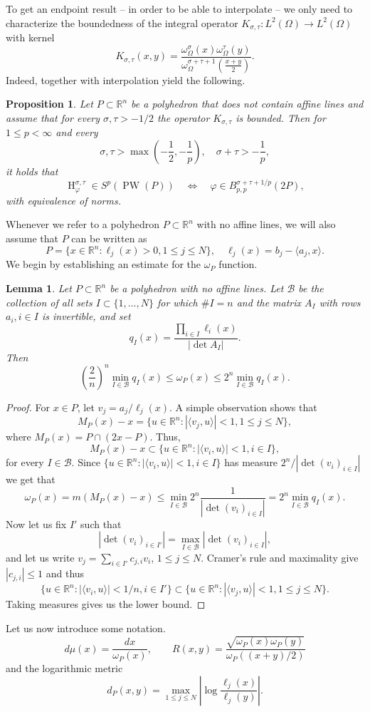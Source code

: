 \documentclass{amsart}
\theoremstyle{plain}
\newtheorem{lm}[theo]{Lemma}
\newtheorem{prop}[theo]{Proposition}
\DeclareMathOperator{\Ha}{H}
\DeclareMathOperator{\PW}{PW}
\begin{document}
To get an endpoint result -- in order to be able to interpolate -- we only need to characterize the boundedness of the integral operator $K_{\sigma,\tau}:L^2(\Omega)\to L^2(\Omega)$ with kernel
$$K_{\sigma,\tau}(x,y)=\frac{\omega_\Omega^\sigma(x)\omega_{\Omega}^\tau(y)}{\omega_\Omega^{\sigma+\tau+1}(\frac{x+y}{2})}.$$ Indeed, \cite[Corollary 1.5, Lemma 3.9 and Theorem 3.10]{bampouras2024besovspacesschattenclass} together with interpolation yield the following.
\begin{prop}\label{polyhconseq}
	Let $P\subset\mathbb{R}^n$ be a polyhedron that does not contain affine lines and assume that for every $\sigma,\tau>-1/2$ the operator $K_{\sigma,\tau}$ is bounded. Then for $1\leq p<\infty$ and every
	$$\sigma,\tau>\max(-\frac{1}{2},-\frac{1}{p}), \quad \sigma+\tau>-\frac{1}{p},$$ it holds that
	$$\Ha_\varphi^{\sigma,\tau}\in S^p(\PW(P))
	\quad\Longleftrightarrow\quad
	\varphi\in B_{p,p}^{\sigma+\tau+1/p}(2P),$$
	with equivalence of norms.
\end{prop}
Whenever we refer to a polyhedron $P\subset\mathbb{R}^n$ with no affine lines, we will also assume that $P$ can be written as
$$P=\{x\in\mathbb{R}^n:\ell_j(x)>0, 1\leq j\leq N\}, \quad \ell_j(x)=b_j-\langle a_j, x\rangle.$$
We begin by establishing an estimate for the $\omega_P$ function.
\begin{lm}\label{omegaformula}
	Let $P\subset\mathbb{R}^n$ be a polyhedron with no affine lines.
	Let $\mathcal{B}$ be the collection of all sets $I\subset \{1,...,N\}$ for which $\# I =n$ and the matrix $A_I$ with rows $a_i, i\in I$ is invertible, and set
	$$q_I(x)=\dfrac{\prod_{i\in I}\ell_i(x)}{|\det A_I|}.$$
	Then $$\left(\frac{2}{n}\right)^n \min_{I\in \mathcal{B}}q_I(x)\leq \omega_P(x)\leq 2^n \min_{I\in \mathcal{B}}q_I(x).$$
\end{lm}
\begin{proof}
	For $x\in P$, let $v_j=a_j/\ell_j(x).$ A simple observation shows that
	$$M_P(x)-x=\{u\in\mathbb{R}^n:|\langle v_j,u\rangle|<1, 1\leq j\leq N\},$$ where $M_P(x)=P\cap (2x-P)$. Thus,
	$$M_P(x)-x\subset \{u\in\mathbb{R}^n:|\langle v_i,u\rangle|<1, i\in I\},$$ for every $I\in\mathcal{B}$. Since $ \{u\in\mathbb{R}^n:|\langle v_i,u\rangle|<1, i\in I\}$ has measure $2^n/|\det(v_i)_{i\in I}|$ we get that
	$$\omega_P(x)=m(M_P(x)-x)\leq \min_{I\in\mathcal{B}}2^n\frac{1}{|\det(v_i)_{i\in I}|}=2^n\min_{I\in\mathcal{B}}q_I(x).$$ Now let us fix $I'$ such that $$|\det(v_i)_{i\in I'}|=\max_{I\in \mathcal{B}} |\det(v_i)_{i\in I}|,$$ and let us write $v_j=\sum_{i\in I'}c_{j,i}v_i$, $1\leq j\leq N$. Cramer's rule and maximality give $|c_{j,i}|\leq 1$ and thus
	$$\{u\in\mathbb{R}^n:|\langle v_i,u\rangle|<1/n, i\in I'\}\subset \{u\in\mathbb{R}^n:|\langle v_j,u\rangle|<1, 1\leq j \leq N\}.$$ Taking measures gives us the lower bound.
\end{proof}
Let us now introduce some notation.
$$d\mu(x)=\frac{dx}{\omega_P(x)},\quad \quad R(x,y)=\frac{\sqrt{\omega_P(x)\omega_P(y)}}{\omega_P((x+y)/2)}$$
and the logarithmic metric
$$d_P(x,y)=\max_{1\leq j\leq N}\left|\log\frac{\ell_j(x)}{\ell_j(y)}\right|.$$
\end{document}
